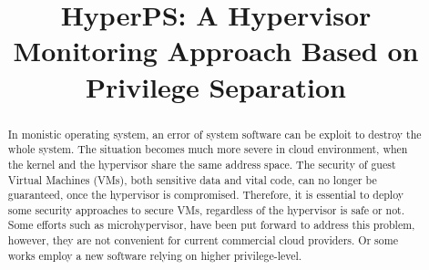 \documentclass[conference]{IEEEtran}
\begin{document}
\title{HyperPS: A Hypervisor Monitoring Approach Based on Privilege Separation}

\author{
\IEEEauthorblockA{\textit{Institute of Information Engineering, Chinese Academy of Sciences} \\
\textit{School of Cyber Security, University of Chinese Academy of Sciences}\\
\{linkunli,liuwenqing\}@iie.ac.cn}
}
\maketitle

\begin{abstract}


\iffalse
In monistic operating system, an error of system software can be exploit to destroy the whole system. The situation becomes much more severe in cloud environment, when the kernel and the hypervisor share the same address space. The security of guest Virtual Machines (VMs), both sensitive data and vital code, can no longer be guaranteed, once the hypervisor is compromised. Therefore, it is essential to deploy some security approaches to secure VMs, regardless of the hypervisor is safe or not. Some efforts such as microhypervisor, have been put forward to address this problem, however, they are not convenient for current commercial cloud providers. Or some works employ a new software relying on higher privilege-level.


\end{abstract}
\end{document}
